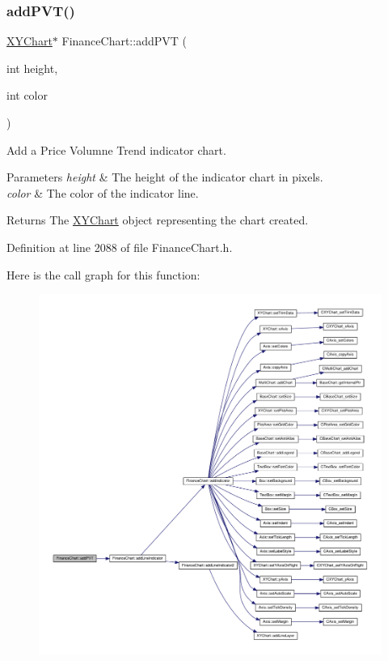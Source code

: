 \subsubsection{\texorpdfstring{add\+P\+V\+T()}{addPVT()}}
{\footnotesize\ttfamily \hyperlink{class_x_y_chart}{X\+Y\+Chart}$\ast$ Finance\+Chart\+::add\+P\+VT (\begin{DoxyParamCaption}\item[{int}]{height,  }\item[{int}]{color }\end{DoxyParamCaption})\hspace{0.3cm}{\ttfamily [inline]}}



Add a Price Volumne Trend indicator chart. 


\begin{DoxyParams}{Parameters}
{\em height} & The height of the indicator chart in pixels.\\
\hline
{\em color} & The color of the indicator line.\\
\hline
\end{DoxyParams}
\begin{DoxyReturn}{Returns}
The \hyperlink{class_x_y_chart}{X\+Y\+Chart} object representing the chart created.
\end{DoxyReturn}


Definition at line 2088 of file Finance\+Chart.\+h.

Here is the call graph for this function\+:
\nopagebreak
\begin{figure}[H]
\begin{center}
\leavevmode
\includegraphics[width=350pt]{class_finance_chart_a3434485481a3f184521145874a62224a_cgraph}
\end{center}
\end{figure}
\mbox{\label{class_finance_chart_ac8ca50e0764d729d0591d1baace193de}} 
